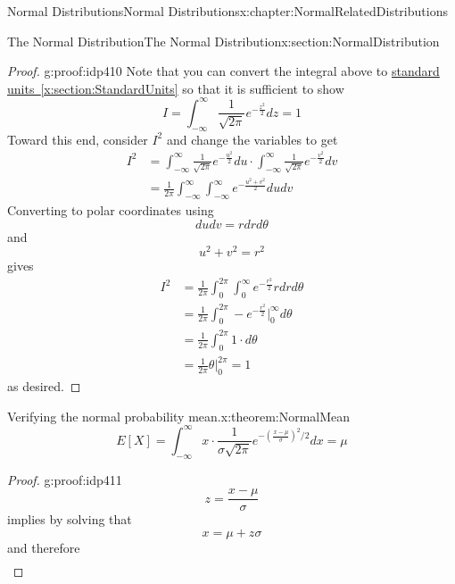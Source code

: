 \documentclass[oneside,10pt,]{book}
\newcommand{\xreffont}{\relax}
\numberwithin{equation}{section}
\begin{document}
\begin{chapterptx}{Normal Distributions}{}{Normal Distributions}{}{}{x:chapter:NormalRelatedDistributions}
\begin{sectionptx}{The Normal Distribution}{}{The Normal Distribution}{}{}{x:section:NormalDistribution}
\begin{proof}{}{g:proof:idp410}
Note that you can convert the integral above to \hyperref[x:section:StandardUnits]{standard units~{\xreffont\ref{x:section:StandardUnits}}} so that it is sufficient to show%
\begin{equation*}
I = \int_{-\infty}^{\infty} \frac{1}{\sqrt{2 \pi}} e^{ -\frac{z^2}{2} } dz = 1
\end{equation*}
Toward this end, consider \(I^2\) and change the variables to get%
\begin{align*}
I^2 & = \int_{-\infty}^{\infty} \frac{1}{\sqrt{2 \pi}} e^{ -\frac{u^2}{2} } du \cdot \int_{-\infty}^{\infty} \frac{1}{\sqrt{2 \pi}} e^{ -\frac{v^2}{2} } dv\\
& = \frac{1}{2 \pi} \int_{-\infty}^{\infty} \int_{-\infty}^{\infty} e^{ -\frac{u^2+v^2}{2} } du dv
\end{align*}
Converting to polar coordinates using%
\begin{equation*}
du dv = r dr d\theta 
\end{equation*}
and%
\begin{equation*}
u^2 + v^2 = r^2
\end{equation*}
gives%
\begin{align*}
I^2 & = \frac{1}{2 \pi} \int_0^{2 \pi} \int_0^{\infty} e^{ -\frac{r^2}{2} } r dr d\theta\\
& = \frac{1}{2 \pi} \int_0^{2 \pi} -e^{ -\frac{r^2}{2} } \big |_0^{\infty} d\theta\\
& = \frac{1}{2 \pi} \int_0^{2 \pi} 1 \cdot d\theta\\
& = \frac{1}{2 \pi} \theta \big |_0^{2 \pi} = 1
\end{align*}
as desired.%
\end{proof}
%
\par
\begin{theorem}{Verifying the normal probability mean.}{}{x:theorem:NormalMean}%
%
\begin{equation*}
E[X] = \int_{-\infty}^{\infty} x \cdot \frac{1}{\sigma \sqrt{2 \pi}} e^{ - \left ( \frac{x-\mu}{\sigma} \right ) ^2 / 2} dx = \mu
\end{equation*}
%
\end{theorem}
\begin{proof}{}{g:proof:idp411}
%
\begin{equation*}
z = \frac{x-\mu}{\sigma}
\end{equation*}
implies by solving that%
\begin{equation*}
x = \mu + z \sigma
\end{equation*}
and therefore%
\begin{align*}

\end{align*}
\end{proof}
\end{sectionptx}
\end{chapterptx}
\end{document}
